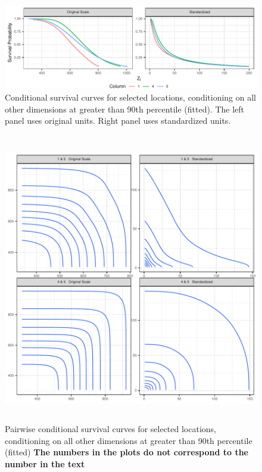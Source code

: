 \begin{figure}[ht]
    \centering
    \caption{Conditional survival curves for selected locations, conditioning on all other dimensions at greater than 90th percentile (fitted)\label{fig:condsurv1d}. The left panel uses original units. Right panel uses standardized units.}
    \includegraphics{./images/condsurv_1d}
\end{figure}

\begin{figure}[htb]
    \centering
    \caption{Pairwise conditional survival curves for selected locations, conditioning on all other dimensions at greater than 90th percentile (fitted)\label{fig:condsurv2d} {\bf The numbers in the plots do not correspond to the number in the text}}
    \includegraphics[height=5in, width=5in]{./images/condsurv_2d}
\end{figure}

